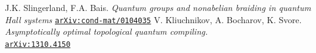 \documentclass[a4paper,10pt,oneside]{book}
\theoremstyle{plain}
\theoremstyle{definition}
\theoremstyle{remark}
\begin{document}
\begin{thebibliography}{99}
   J.K. Slingerland, F.A. Bais. \textit{Quantum groups and nonabelian braiding in quantum Hall systems} \href{https://arxiv.org/abs/cond-mat/0104035}{\texttt{arXiv:cond-mat/0104035}}
   V. Kliuchnikov, A. Bocharov, K. Svore. \textit{Asymptotically optimal topological quantum compiling.} \\ \href{https://arxiv.org/abs/1310.4150}{\texttt{arXiv:1310.4150}}


\end{thebibliography}
\end{document}
